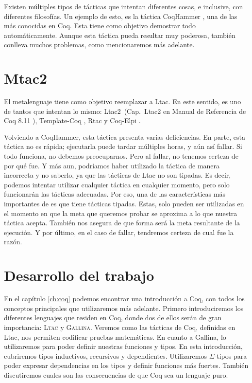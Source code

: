 Existen múltiples tipos de tácticas que intentan diferentes cosas, e inclusive, con diferentes filosofías.
Un ejemplo de esto, es la táctica CoqHammer \cite{DBLP:journals/jar/CzajkaK18}, una de las más conocidas en Coq. Esta tiene como objetivo demostrar todo automáticamente.
Aunque esta táctica pueda resultar muy poderosa, también conlleva muchos problemas, como mencionaremos más adelante.

\section{Mtac2}

El metalenguaje \Mtac \cite{DBLP:journals/pacmpl/KaiserZKRD18} tiene como objetivo reemplazar a Ltac.
En este sentido, es uno de tantos que intentan lo mismo: Ltac2~(Cap.~Ltac2 en Manual de Referencia de Coq 8.11 \cite{Coq}), Template-Coq \cite{DBLP:conf/itp/AnandBCST18}, Rtac \cite{DBLP:conf/esop/MalechaB16} y Coq-Elpi \cite{tassi:hal-01637063}.

Volviendo a CoqHammer, esta táctica presenta varias deficiencias.
En parte, esta táctica no es rápida; ejecutarla puede tardar múltiples horas, y aún así fallar.
Si todo funciona, no debemos preocuparnos.
Pero al fallar, no tenemos certeza de por qué fue.
Y más aun, podríamos haber utilizado la táctica de manera incorrecta y no saberlo, ya que las tácticas de Ltac no son tipadas.
Es decir, podemos intentar utilizar cualquier táctica en cualquier momento, pero solo funcionarán las tácticas adecuadas.
Por eso, una de las características más importantes de \mtac es que tiene tácticas tipadas.
Estas, solo pueden ser utilizadas en el momento en que la meta que queremos probar se aproxima a lo que nuestra táctica acepta.
También nos asegura de que forma será la meta resultante de la ejecución.
Y por último, en el caso de fallar, tendremos certeza de cual fue la razón.


\section{Desarrollo del trabajo}

En el capítulo \ref{ch:coq} podemos encontrar una introducción a Coq, con todos los conceptos principales que utilizaremos más adelante.
Primero introduciremos los diferentes lenguajes que residen en Coq, donde dos de ellos serán de gran importancia: \textsc{Ltac} y \textsc{Gallina}.
Veremos como las tácticas de Coq, definidas en Ltac, nos permiten codificar pruebas matemáticas.
En cuanto a Gallina, lo utilizaremos para poder definir nuestras funciones y tipos.
En esta introducción, cubriremos tipos inductivos, recursivos y dependientes.
Utilizaremos $\Sigma$-tipos para poder expresar dependencias en los tipos y definir funciones más fuertes.
También discutiremos cuales son las consecuencias de que Coq sea un lenguaje puro.

